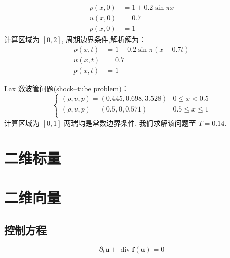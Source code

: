\documentclass{book}
\begin{document}
\begin{example}{}{}
    \begin{equation}
        \begin{aligned}
            \rho(x, 0) & =1+0.2 \sin \pi x \\
            u(x, 0)    & =0.7              \\
            p(x, 0)    & =1
        \end{aligned}
    \end{equation}
    计算区域为 $[0,2]$, 周期边界条件,解析解为：
    \begin{equation}
        \begin{aligned}
            \rho(x, t) & =1+0.2 \sin \pi(x-0.7 t) \\
            u(x, t)    & =0.7                     \\
            p(x, t)    & =1
        \end{aligned}
    \end{equation}


\end{example}

\begin{example}{}{}
    Lax 激波管问题(shock–tube problem)\cite{RN204}：
    \begin{equation}
        \begin{cases}
            (\rho, v, p)  =(0.445,0.698,3.528) & 0\leqslant x < 0.5         \\
            (\rho, v, p) =(0.5,0,0.571)        & 0.5\leqslant x \leqslant 1 \\
        \end{cases}
    \end{equation}
    计算区域为 $[0,1]$ 两瑞均是常数边界条件, 我们求解该问题至 $T=0.14$.

\end{example}
\section{二维标量}

\section{二维向量}
\subsection{控制方程}
\begin{equation}
    \partial_{t} \boldsymbol{u}+\operatorname{div} \boldsymbol{f} (\boldsymbol{u})=0
\end{equation}
\end{document}
